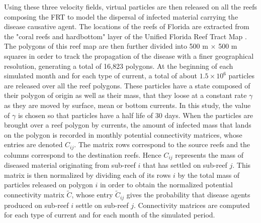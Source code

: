 \documentclass[utf8]{frontiersSCNS}
\begin{document}
Using these three velocity fields, virtual particles are then released on all the reefs composing the FRT to model the dispersal of infected material carrying the disease causative agent. The locations of the reefs of Florida are extracted from the "coral reefs and hardbottom" layer of the Unified Florida Reef Tract Map \citep{fwc2017unified}. The polygons of this reef map are then further divided into 500 m $\times$ 500 m squares in order to track the propagation of the disease with a finer geographical resolution, generating a total of 16,823 polygons. At the beginning of each simulated month and for each type of current, a total of about $1.5 \times 10^6$ particles are released over all the reef polygons. These particles have a state composed of their polygon of origin as well as their mass, that they loose at a constant rate $\gamma$ as they are moved by surface, mean or bottom currents. In this study, the value of $\gamma$ is chosen so that particles have a half life of 30 days. When the particles are brought over a reef polygon by currents, the amount of infected mass that lands on the polygon is recorded in monthly potential connectivity matrices, whose entries are denoted $C_{ij}$. The matrix rows correspond to the source reefs and the columns correspond to the destination reefs. Hence $C_{ij}$ represents the mass of diseased material originating from sub-reef $i$ that has settled on sub-reef $j$. This matrix is then normalized by dividing each of its rows $i$ by the total mass of particles released on polygon $i$ in order to obtain the normalized potential connectivity matrix $\tilde{C}$, whose entry $\tilde{C}_{ij}$ gives the probability that disease agents produced on sub-reef $i$ settle on sub-reef $j$. Connectivity matrices are computed for each type of current and for each month of the simulated period.
\end{document}
